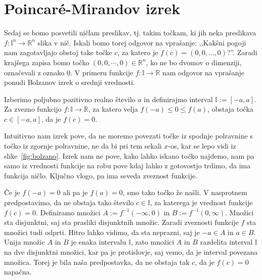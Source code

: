 \documentclass[mat1]{fmfdelo}
\newcommand{\R}{\mathbb R}
\newcommand{\I}{\mathbb I}
\newcommand{\0}{\underline{0}}
\def\citat#1{,,#1''}
\begin{document}
%
\section{Poincar\'e-Mirandov izrek}\label{raz:PM}
Sedaj se bomo posvetili ničlam preslikav, tj. takim točkam, ki jih neka preslikava $f : \I^n \to \R^n$ slika v nič. Iskali bomo torej odgovor na vprašanje: \citat{Kakšni pogoji nam zagotavljajo obstoj take točke $c$, za katero je $f(c) = (0, 0, \dots, 0)$?}. Zaradi krajšega zapisa bomo točko $(0, 0, \cdots, 0) \in \R^n$, ko ne bo dvomov o dimenziji, označevali z oznako $\0$. V primeru funkcije $f : \I \to \R$ nam odgovor na vprašanje ponudi Bolzanov izrek o srednji vrednosti.
\begin{izrek}\label{izr:bolzano}
Izberimo poljubno pozitivno realno število $a$ in definirajmo interval $\I := [-a, a]$. Za zvezno funkcijo $f : \I \to \R$, za katero velja $f(-a) \leq 0 \leq f(a)$, obstaja točka $c \in [-a, a]$, da je $f(c) = 0$.
\end{izrek}
Intuitivno nam izrek pove, da ne moremo povezati točke iz spodnje polravnine s točko iz zgornje polravnine, ne da bi pri tem sekali $x$-os, kar se lepo vidi iz slike~\ref{fig:bolzano}. Izrek nam ne pove, kako lahko iskano točko najdemo, nam pa samo iz vrednosti funkcije na robu pove kdaj lahko z gotovostjo trdimo, da ima funkcija ničlo. Ključno vlogo, pa ima seveda zveznost funkcije.
\begin{dokaz}
Če je $f(-a) = 0$ ali pa je $f(a) = 0$, smo tako točko že našli. V nasprotnem predpostavimo, da ne obstaja tako število $c \in \I$, za katerega je vrednost funkcije $f(c) = 0$. Definiramo množici $A := f^{-1}(- \infty, 0)$ in $B := f^{-1}(0, \infty)$. Množici sta disjunktni, saj sta prasliki disjunktnih množic. Zaradi zveznosti funkcije $f$ sta množici tudi odprti. Hitro lahko vidimo, da sta neprazni, saj je $-a \in A$ in $a \in B$. Unija množic $A$ in $B$ je enaka intervalu $\I$, zato množici $A$ in $B$ razdelita interval $\I$ na dve disjunktni množici, kar pa je protislovje, saj vemo, da je interval povezana množica. Torej je bila naša predpostavka, da ne obstaja tak $c$, da je $f(c) = 0$ napačna.
\end{dokaz}
\end{document}
